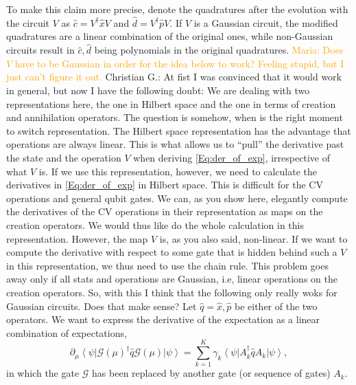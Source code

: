 \documentclass[aps,pra,10pt,twocolumn,groupedaddress,nofootinbib]{revtex4-1}
\theoremstyle{plain}
\newcommand{\ket}[1]{\ensuremath{\left| #1 \right \rangle}}
\newcommand{\bra}[1]{\ensuremath{\left \langle #1 \right |}}
\newcommand{\x}{\hat{x}}
\newcommand{\p}{\hat{p}}
\renewcommand{\c}{\hat{c}}
\renewcommand{\d}{\hat{d}}
\newcommand{\G}{\mathcal{G}}
\newcommand{\maria}[1]{\textcolor{orange}{Maria: #1}}
\newcommand{\cg}[1]{\textcolor{cyan!80!black}{Christian G.: #1}}
\begin{document}
To make this claim more precise, denote the quadratures after the evolution with the circuit $V$ as $\c = V^{\dagger} \x V$ and $\d = V^{\dagger} \p V$. If $V$ is a Gaussian circuit, the modified quadratures are a linear combination of the original ones, while non-Gaussian circuits result in $\c, \d$ being polynomials in the original quadratures. \maria{Does $V$ have to be Gaussian in order for the idea below to work? Feeling stupid, but I just can't figure it out.}
\cg{At fist I was convinced that it would work in general, but now I have the following doubt: We are dealing with two representations here, the one in Hilbert space and the one in terms of creation and annihilation operators. The question is somehow, when is the right moment to switch representation. The Hilbert space representation has the advantage that operations are always linear. This is what allows us to ``pull'' the derivative past the state and the operation $V$ when deriving \eqref{Eq:der_of_exp}, irrespective of what $V$ is. If we use this representation, however, we need to calculate the derivatives in \eqref{Eq:der_of_exp} in Hilbert space. This is difficult for the CV operations and general qubit gates. We can, as you show here, elegantly compute the derivatives of the CV operations in their representation as maps on the creation operators. We would thus like do the whole calculation in this representation. However, the map $V$ is, as you also said, non-linear. If we want to compute the derivative with respect to some gate that is hidden behind such a $V$ in this representation, we thus need to use the chain rule. This problem goes away only if all stats and operations are Gaussian, i.e, linear operations on the creation operators. So, with this I think that the following only really woks for Gaussian circuits. Does that make sense?}
Let $\hat{q} = \x, \p$ be either of the two operators. We want to express the derivative of the expectation as a linear combination of expectations,
\begin{equation}
	\partial_{\mu}\bra{\psi} \G(\mu)^{\dagger} \hat{q} \G(\mu) \ket{\psi} = \sum_{k=1}^K \gamma_k \bra{\psi} A_k^{\dagger} \hat{q} A_k \ket{\psi},
	\label{Eq:sumofsympl}
\end{equation}
in which the gate $\G$ has been replaced by another gate (or sequence of gates) $A_k$. \\
\end{document}
